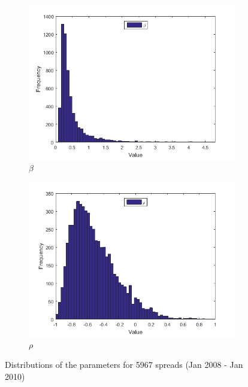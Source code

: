 \documentclass[11pt,a4,twosided,singlespacing,titlepagenumber=on]{scrreprt}
\numberwithin{equation}{chapter} %
\theoremstyle{remark}
\begin{document}
\begin{figure}[H]
\begin{subfigure}[t]{0.32\textwidth}
        \includegraphics[width=1\textwidth]{res/params/6575_7306/5}
        \caption{$\beta$}
    \end{subfigure}
    \begin{subfigure}[t]{0.32\textwidth}
        \centering
        \includegraphics[width=1\textwidth]{res/params/6575_7306/6}
        \caption{$\rho$}
    \end{subfigure}
    \caption{Distributions of the parameters for 5967 spreads (Jan 2008 - Jan 2010)}
    \label{fig:param_dists_2000_2002}
\end{figure}
\end{document}
